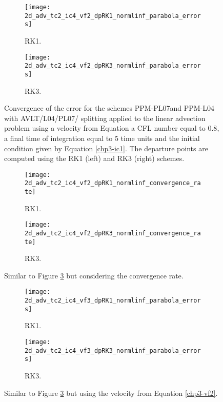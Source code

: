 \begin{figure}[!htb]
	\centering
	\begin{subfigure}{0.45\textwidth}
		\centering
		\texttt{[image: 2d\_adv\_tc2\_ic4\_vf2\_dpRK1\_normlinf\_parabola\_errors]}
		\caption{RK1.\label{chp3-sec-exp-adv5-error1}}
	\end{subfigure}
	\begin{subfigure}{0.45\textwidth}
		\centering
		\texttt{[image: 2d\_adv\_tc2\_ic4\_vf2\_dpRK3\_normlinf\_parabola\_errors]}
		\caption{RK3.\label{chp3-sec-exp-adv5-error2}}
	\end{subfigure}
	\caption{Convergence of the error for the schemes
	PPM-PL07and PPM-L04 with AVLT/L04/PL07/ splitting
	applied to the linear advection problem using a velocity from Equation
	a CFL number equal to $0.8$, a final time of integration equal to 5 time units
	and the initial condition given by Equation \eqref{chp3-ic1}.
	The departure points are computed using the RK1 (left) and RK3 (right) schemes.\label{chp3-sec-exp-adv5}}
\end{figure}

\begin{figure}[!htb]
	\centering
	\begin{subfigure}{0.45\textwidth}
		\centering
		\texttt{[image: 2d\_adv\_tc2\_ic4\_vf2\_dpRK1\_normlinf\_convergence\_rate]}
		\caption{RK1.\label{chp3-sec-exp-adv6-error1}}
	\end{subfigure}
	\begin{subfigure}{0.45\textwidth}
		\centering
		\texttt{[image: 2d\_adv\_tc2\_ic4\_vf2\_dpRK3\_normlinf\_convergence\_rate]}
		\caption{RK3.\label{chp3-sec-exp-adv6-error2}}
	\end{subfigure}
	\caption{Similar to Figure \ref{chp3-sec-exp-adv5} but considering the convergence rate.\label{chp3-sec-exp-adv6}}
\end{figure}


\begin{figure}[!htb]
	\centering
	\begin{subfigure}{0.45\textwidth}
		\centering
		\texttt{[image: 2d\_adv\_tc2\_ic4\_vf3\_dpRK1\_normlinf\_parabola\_errors]}
		\caption{RK1.\label{chp3-sec-exp-adv7-error1}}
	\end{subfigure}
	\begin{subfigure}{0.45\textwidth}
		\centering
		\texttt{[image: 2d\_adv\_tc2\_ic4\_vf3\_dpRK3\_normlinf\_parabola\_errors]}
		\caption{RK3.\label{chp3-sec-exp-adv7-error2}}
	\end{subfigure}
	\caption{Similar to Figure \ref{chp3-sec-exp-adv5} but using the velocity from Equation \eqref{chp3-vf2}.\label{chp3-sec-exp-adv7}}
\end{figure}

